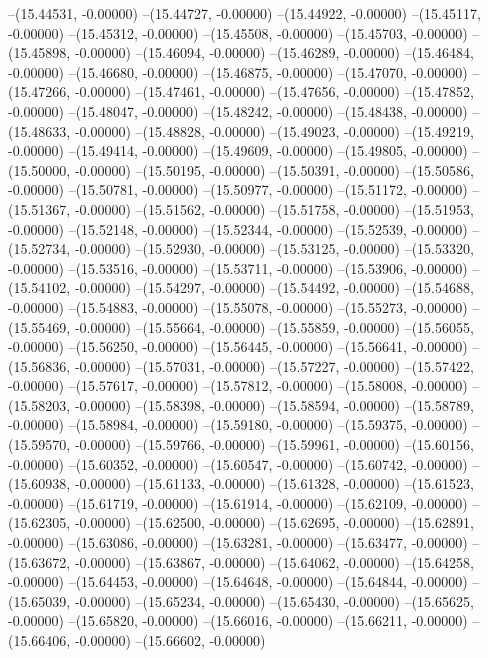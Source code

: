 --(15.44531, -0.00000)
--(15.44727, -0.00000)
--(15.44922, -0.00000)
--(15.45117, -0.00000)
--(15.45312, -0.00000)
--(15.45508, -0.00000)
--(15.45703, -0.00000)
--(15.45898, -0.00000)
--(15.46094, -0.00000)
--(15.46289, -0.00000)
--(15.46484, -0.00000)
--(15.46680, -0.00000)
--(15.46875, -0.00000)
--(15.47070, -0.00000)
--(15.47266, -0.00000)
--(15.47461, -0.00000)
--(15.47656, -0.00000)
--(15.47852, -0.00000)
--(15.48047, -0.00000)
--(15.48242, -0.00000)
--(15.48438, -0.00000)
--(15.48633, -0.00000)
--(15.48828, -0.00000)
--(15.49023, -0.00000)
--(15.49219, -0.00000)
--(15.49414, -0.00000)
--(15.49609, -0.00000)
--(15.49805, -0.00000)
--(15.50000, -0.00000)
--(15.50195, -0.00000)
--(15.50391, -0.00000)
--(15.50586, -0.00000)
--(15.50781, -0.00000)
--(15.50977, -0.00000)
--(15.51172, -0.00000)
--(15.51367, -0.00000)
--(15.51562, -0.00000)
--(15.51758, -0.00000)
--(15.51953, -0.00000)
--(15.52148, -0.00000)
--(15.52344, -0.00000)
--(15.52539, -0.00000)
--(15.52734, -0.00000)
--(15.52930, -0.00000)
--(15.53125, -0.00000)
--(15.53320, -0.00000)
--(15.53516, -0.00000)
--(15.53711, -0.00000)
--(15.53906, -0.00000)
--(15.54102, -0.00000)
--(15.54297, -0.00000)
--(15.54492, -0.00000)
--(15.54688, -0.00000)
--(15.54883, -0.00000)
--(15.55078, -0.00000)
--(15.55273, -0.00000)
--(15.55469, -0.00000)
--(15.55664, -0.00000)
--(15.55859, -0.00000)
--(15.56055, -0.00000)
--(15.56250, -0.00000)
--(15.56445, -0.00000)
--(15.56641, -0.00000)
--(15.56836, -0.00000)
--(15.57031, -0.00000)
--(15.57227, -0.00000)
--(15.57422, -0.00000)
--(15.57617, -0.00000)
--(15.57812, -0.00000)
--(15.58008, -0.00000)
--(15.58203, -0.00000)
--(15.58398, -0.00000)
--(15.58594, -0.00000)
--(15.58789, -0.00000)
--(15.58984, -0.00000)
--(15.59180, -0.00000)
--(15.59375, -0.00000)
--(15.59570, -0.00000)
--(15.59766, -0.00000)
--(15.59961, -0.00000)
--(15.60156, -0.00000)
--(15.60352, -0.00000)
--(15.60547, -0.00000)
--(15.60742, -0.00000)
--(15.60938, -0.00000)
--(15.61133, -0.00000)
--(15.61328, -0.00000)
--(15.61523, -0.00000)
--(15.61719, -0.00000)
--(15.61914, -0.00000)
--(15.62109, -0.00000)
--(15.62305, -0.00000)
--(15.62500, -0.00000)
--(15.62695, -0.00000)
--(15.62891, -0.00000)
--(15.63086, -0.00000)
--(15.63281, -0.00000)
--(15.63477, -0.00000)
--(15.63672, -0.00000)
--(15.63867, -0.00000)
--(15.64062, -0.00000)
--(15.64258, -0.00000)
--(15.64453, -0.00000)
--(15.64648, -0.00000)
--(15.64844, -0.00000)
--(15.65039, -0.00000)
--(15.65234, -0.00000)
--(15.65430, -0.00000)
--(15.65625, -0.00000)
--(15.65820, -0.00000)
--(15.66016, -0.00000)
--(15.66211, -0.00000)
--(15.66406, -0.00000)
--(15.66602, -0.00000)
